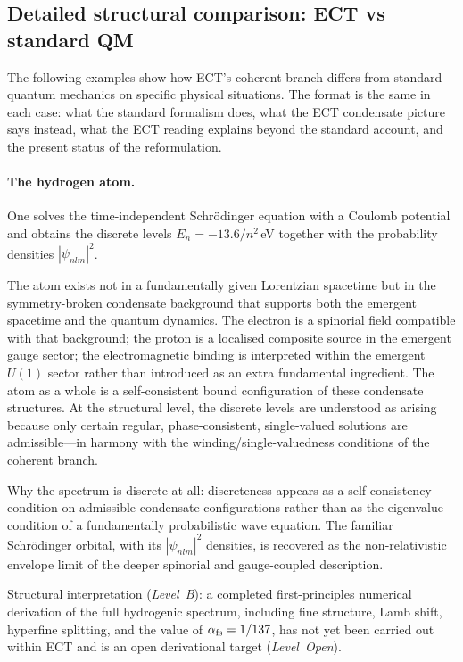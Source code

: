 \documentclass[11pt,a4paper]{article}
\begin{document}
\subsection{Detailed structural comparison: ECT vs standard QM}

The following examples show how ECT's coherent branch differs from standard quantum mechanics on specific physical situations.  The format is the same in each case: what the standard formalism does, what the ECT condensate picture says instead, what the ECT reading explains beyond the standard account, and the present status of the reformulation.

\paragraph{The hydrogen atom.}
\begin{description}[leftmargin=2.8cm, style=nextline]
\item[Standard QM.] One solves the time-independent Schr\"odinger equation with a Coulomb potential and obtains the discrete levels $E_n = -13.6/n^2\,$eV together with the probability densities $|\psi_{nlm}|^2$.
\item[ECT (physical picture).] The atom exists not in a fundamentally given Lorentzian spacetime but in the symmetry-broken condensate background that supports both the emergent spacetime and the quantum dynamics.  The electron is a spinorial field compatible with that background; the proton is a localised composite source in the emergent gauge sector; the electromagnetic binding is interpreted within the emergent $U(1)$ sector rather than introduced as an extra fundamental ingredient.  The atom as a whole is a self-consistent bound configuration of these condensate structures.  At the structural level, the discrete levels are understood as arising because only certain regular, phase-consistent, single-valued solutions are admissible---in harmony with the winding/single-valuedness conditions of the coherent branch.
\item[What this explains.] Why the spectrum is discrete at all: discreteness appears as a self-consistency condition on admissible condensate configurations rather than as the eigenvalue condition of a fundamentally probabilistic wave equation.  The familiar Schr\"odinger orbital, with its $|\psi_{nlm}|^2$ densities, is recovered as the non-relativistic envelope limit of the deeper spinorial and gauge-coupled description.
\item[Status.] Structural interpretation (\emph{Level~B}): a completed first-principles numerical derivation of the full hydrogenic spectrum, including fine structure, Lamb shift, hyperfine splitting, and the value of $\alpha_{\rm fs}=1/137$, has not yet been carried out within ECT and is an open derivational target (\emph{Level~Open}).
\end{description}
\end{document}
